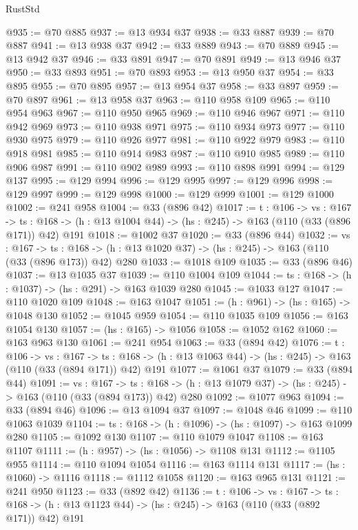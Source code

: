 \begin{lexlean}{RustStd}
\begin{coremodule}
@935 := @70 @885
@937 := @13 @934 @37
@938 := @33 @887
@939 := @70 @887
@941 := @13 @938 @37
@942 := @33 @889
@943 := @70 @889
@945 := @13 @942 @37
@946 := @33 @891
@947 := @70 @891
@949 := @13 @946 @37
@950 := @33 @893
@951 := @70 @893
@953 := @13 @950 @37
@954 := @33 @895
@955 := @70 @895
@957 := @13 @954 @37
@958 := @33 @897
@959 := @70 @897
@961 := @13 @958 @37
@963 := @110 @958 @109
@965 := @110 @954 @963
@967 := @110 @950 @965
@969 := @110 @946 @967
@971 := @110 @942 @969
@973 := @110 @938 @971
@975 := @110 @934 @973
@977 := @110 @930 @975
@979 := @110 @926 @977
@981 := @110 @922 @979
@983 := @110 @918 @981
@985 := @110 @914 @983
@987 := @110 @910 @985
@989 := @110 @906 @987
@991 := @110 @902 @989
@993 := @110 @898 @991
@994 := @129 @137
@995 := @129 @994
@996 := @129 @995
@997 := @129 @996
@998 := @129 @997
@999 := @129 @998
@1000 := @129 @999
@1001 := @129 @1000
@1002 := @241 @958
@1004 := @33 (@896 @42)
@1017 := {t : @106} ->
  {vs : @167} ->
  {ts : @168} -> (h : @13 @1004 @44) -> (hs : @245) -> @163 (@110 (@33 (@896 @171)) @42) @191
@1018 := @1002 @37
@1020 := @33 (@896 @44)
@1032 := {vs : @167} ->
  {ts : @168} -> (h : @13 @1020 @37) -> (hs : @245) -> @163 (@110 (@33 (@896 @173)) @42) @280
@1033 := @1018 @109
@1035 := @33 (@896 @46)
@1037 := @13 @1035 @37
@1039 := @110 @1004 @109
@1044 := {ts : @168} -> (h : @1037) -> (hs : @291) -> @163 @1039 @280
@1045 := @1033 @127
@1047 := @110 @1020 @109
@1048 := @163 @1047
@1051 := (h : @961) -> (hs : @165) -> @1048 @130
@1052 := @1045 @959
@1054 := @110 @1035 @109
@1056 := @163 @1054 @130
@1057 := (hs : @165) -> @1056
@1058 := @1052 @162
@1060 := @163 @963 @130
@1061 := @241 @954
@1063 := @33 (@894 @42)
@1076 := {t : @106} ->
  {vs : @167} ->
  {ts : @168} -> (h : @13 @1063 @44) -> (hs : @245) -> @163 (@110 (@33 (@894 @171)) @42) @191
@1077 := @1061 @37
@1079 := @33 (@894 @44)
@1091 := {vs : @167} ->
  {ts : @168} -> (h : @13 @1079 @37) -> (hs : @245) -> @163 (@110 (@33 (@894 @173)) @42) @280
@1092 := @1077 @963
@1094 := @33 (@894 @46)
@1096 := @13 @1094 @37
@1097 := @1048 @46
@1099 := @110 @1063 @1039
@1104 := {ts : @168} -> (h : @1096) -> (hs : @1097) -> @163 @1099 @280
@1105 := @1092 @130
@1107 := @110 @1079 @1047
@1108 := @163 @1107
@1111 := (h : @957) -> (hs : @1056) -> @1108 @131
@1112 := @1105 @955
@1114 := @110 @1094 @1054
@1116 := @163 @1114 @131
@1117 := (hs : @1060) -> @1116
@1118 := @1112 @1058
@1120 := @163 @965 @131
@1121 := @241 @950
@1123 := @33 (@892 @42)
@1136 := {t : @106} ->
  {vs : @167} ->
  {ts : @168} -> (h : @13 @1123 @44) -> (hs : @245) -> @163 (@110 (@33 (@892 @171)) @42) @191

\end{coremodule}
\end{lexlean}
